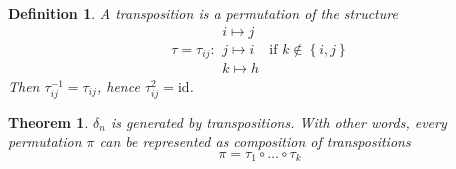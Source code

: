 \documentclass[a4paper,landscape,twocolumn]{article}
\newcommand\set[1]{\left\{#1\right\}}
\newtheorem{theorem}{Theorem}
\newtheorem{defi}{Definition}
\begin{document}
\begin{defi}
  A \emph{transposition} is a permutation of the structure
  \[
    \tau = \tau_{ij}:
    \begin{array}{c}
      i \mapsto j \\
      j \mapsto i \\
      k \mapsto h
    \end{array}
    \text{ if } k \notin \set{i,j}
  \]
  Then $\tau_{ij}^{-1} = \tau_{ij}$, hence $\tau_{ij}^2 = \text{id}$.
\end{defi}
\begin{theorem}
  \label{theorem-7.13}
  $\delta_n$ is generated by transpositions.
  With other words, every permutation $\pi$ can be represented as composition of transpositions
  \[ \pi = \tau_1 \circ \ldots \circ \tau_k \]
\end{theorem}
\end{document}
